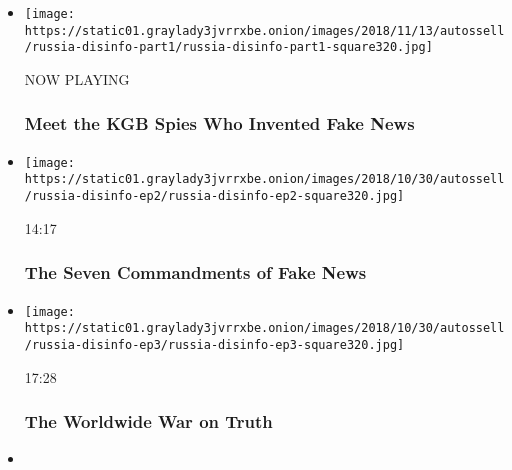 \begin{itemize}
\item
  \texttt{[image: https://static01.graylady3jvrrxbe.onion/images/2018/11/13/autossell/russia-disinfo-part1/russia-disinfo-part1-square320.jpg]}

  NOW PLAYING

  \hypertarget{meet-the-kgb-spies-who-invented-fake-news-2}{%
  \subsubsection{Meet the KGB Spies Who Invented Fake
  News}\label{meet-the-kgb-spies-who-invented-fake-news-2}}
\item
  \href{https://www.nytimes3xbfgragh.onion/video/opinion/100000006188102/what-is-pizzagate.html?action=click\&module=video-series-bar\&region=header\&pgtype=Article\&playlistId=video/opinion}{}

  \texttt{[image: https://static01.graylady3jvrrxbe.onion/images/2018/10/30/autossell/russia-disinfo-ep2/russia-disinfo-ep2-square320.jpg]}

  14:17

  \hypertarget{the-seven-commandments-of-fake-news}{%
  \subsubsection{The Seven Commandments of Fake
  News}\label{the-seven-commandments-of-fake-news}}
\item
  \href{https://www.nytimes3xbfgragh.onion/video/opinion/100000006188105/countering-disinformation-active-measures.html?action=click\&module=video-series-bar\&region=header\&pgtype=Article\&playlistId=video/opinion}{}

  \texttt{[image: https://static01.graylady3jvrrxbe.onion/images/2018/10/30/autossell/russia-disinfo-ep3/russia-disinfo-ep3-square320.jpg]}

  17:28

  \hypertarget{the-worldwide-war-on-truth}{%
  \subsubsection{The Worldwide War on
  Truth}\label{the-worldwide-war-on-truth}}
\item
  \href{https://www.nytimes3xbfgragh.onion/video/opinion/100000007247238/tears-teacher.html?action=click\&module=video-series-bar\&region=header\&pgtype=Article\&playlistId=video/opinion}{}


\end{itemize}

